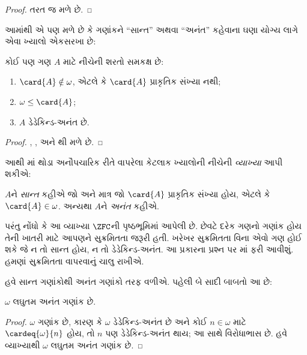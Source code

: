 \begin{proof}
તરત જ મળે છે.
\end{proof}
\noindent
આમાંથી એ પણ મળે છે કે ગણાંકને ``સાન્ત'' અથવા
``અનંત'' કહેવાના ઘણા યોગ્ય લાગે એવા ખ્યાલો એકસરખા છે:
\begin{thm}કોઈ પણ ગણ $A$ માટે નીચેની શરતો સમકક્ષ છે:
\begin{enumerate}
	\item{} $\card{A} \notin \omega$, એટલે કે
	$\card{A}$ પ્રાકૃતિક સંખ્યા નથી;
	\item{} $\omega \leq \card{A}$;
	\item{} $A$ ડેડેકિન્ડ-અનંત છે.
\end{enumerate}
\end{thm}

\begin{proof}
,
,
અને થી મળે છે.
\end{proof}

આથી માં થોડા અનૌપચારિક રીતે
વાપરેલા કેટલાક ખ્યાલોની નીચેની \emph{વ્યાખ્યા} આપી શકીએ:

\begin{defn}
$A$ને \emph{સાન્ત} કહીએ જો અને માત્ર જો
$\card{A}$ પ્રાકૃતિક સંખ્યા હોય, એટલે કે
$\card{A} \in \omega$. અન્યથા $A$ને
\emph{અનંત} કહીએ.
\end{defn}
\noindent
પરંતુ નોંધો કે આ વ્યાખ્યા $\ZFC$ની પૃષ્ઠભૂમિમાં
આપેલી છે. છેવટે દરેક ગણનો ગણાંક હોય તેની ખાતરી
માટે આપણને સુક્રમિતતા જરૂરી હતી. ખરેખર સુક્રમિતતા
વિના એવો ગણ હોઈ શકે જે ન તો સાન્ત હોય, ન તો
ડેડેકિન્ડ-અનંત. આ પ્રકારના પ્રશ્ન પર
માં ફરી આવીશું. હમણાં
સુક્રમિતતા વાપરવાનું ચાલુ રાખીએ.

હવે સાન્ત ગણાંકોથી અનંત ગણાંકો તરફ વળીએ.
પહેલી બે સાદી બાબતો આ છે:

\begin{cor}
$\omega$ લઘુતમ અનંત ગણાંક છે.
\end{cor}

\begin{proof}
$\omega$ ગણાંક છે, કારણ કે $\omega$ ડેડેકિન્ડ-અનંત
છે અને કોઈ $n \in \omega$ માટે
$\cardeq{\omega}{n}$ હોય, તો $n$ પણ ડેડેકિન્ડ-અનંત
થાય; આ 
સાથે વિરોધાભાસ છે. હવે વ્યાખ્યાથી $\omega$
લઘુતમ અનંત ગણાંક છે.
\end{proof}

